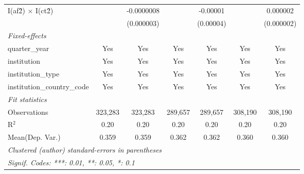 \begin{tabular}{lcccccc}
   I(af\^2) $\times$ I(ct\^2)         &               & -0.0000008      &               & -0.00001       &               & 0.000002\\   
                                      &               & (0.000003)      &               & (0.00004)      &               & (0.000002)\\   
   \midrule
   \emph{Fixed-effects}\\
   quarter\_year                      & Yes           & Yes             & Yes           & Yes            & Yes           & Yes\\  
   institution                        & Yes           & Yes             & Yes           & Yes            & Yes           & Yes\\  
   institution\_type                  & Yes           & Yes             & Yes           & Yes            & Yes           & Yes\\  
   institution\_country\_code         & Yes           & Yes             & Yes           & Yes            & Yes           & Yes\\  
   \midrule
   \emph{Fit statistics}\\
   Observations                       & 323,283       & 323,283         & 289,657       & 289,657        & 308,190       & 308,190\\  
   R$^2$                              & 0.20          & 0.20            & 0.20          & 0.20           & 0.20          & 0.20\\  
Mean(Dep. Var.) & 0.359 & 0.359 & 0.362 & 0.362 & 0.360 & 0.360 \\
   \midrule \midrule
   \multicolumn{7}{l}{\emph{Clustered (author) standard-errors in parentheses}}\\
   \multicolumn{7}{l}{\emph{Signif. Codes: ***: 0.01, **: 0.05, *: 0.1}}\\
\end{tabular}
\par\endgroup
